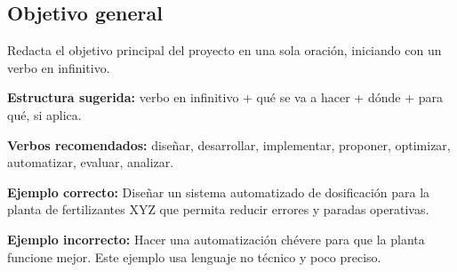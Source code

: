 \documentclass[12pt,letterpaper]{report}
\begin{document}
\subsection{Objetivo general}
\begin{instrucciones}
Redacta el objetivo principal del proyecto en una sola oración, iniciando con un verbo en infinitivo.

\vspace{2mm}
\noindent \textbf{Estructura sugerida:} verbo en infinitivo + qué se va a hacer + dónde + para qué, si aplica.

\vspace{2mm}
\noindent \textbf{Verbos recomendados:} diseñar, desarrollar, implementar, proponer, optimizar, automatizar, evaluar, analizar.

\vspace{2mm}
\noindent \textbf{Ejemplo correcto:} Diseñar un sistema automatizado de dosificación para la planta de fertilizantes XYZ que permita reducir errores y paradas operativas.

\vspace{2mm}
\noindent \textbf{Ejemplo incorrecto:} Hacer una automatización chévere para que la planta funcione mejor. Este ejemplo usa lenguaje no técnico y poco preciso.
\end{instrucciones}
\end{document}
